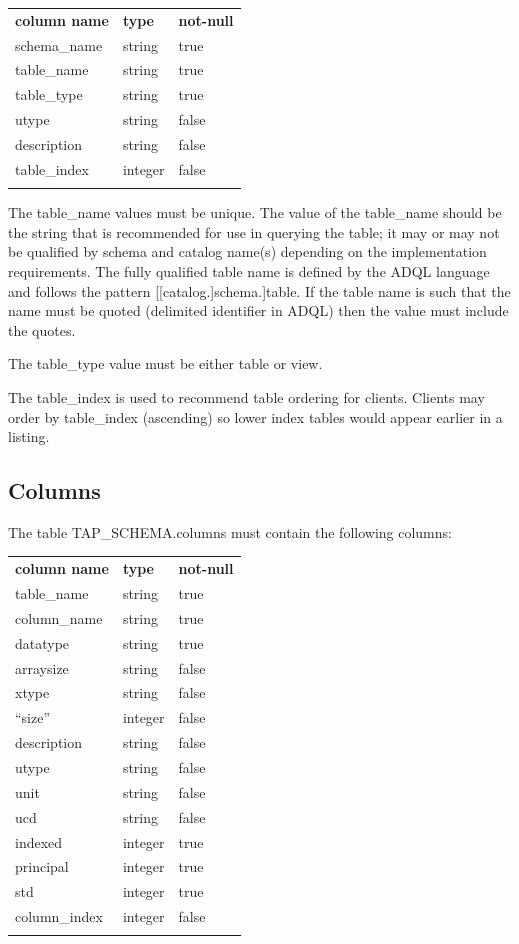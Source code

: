 \documentclass[11pt,letter]{ivoa}
\newcommand{\tapschema}{TAP\_SCHE\-MA}
\newcommand{\tapschema}{\mbox{%
  \relsize{-0.5}TAP\discretionary{-}{}{\kern-2pt\_}SCHEMA}}
\begin{document}
\begin{inlinetable}
\begin{tabular}{l l l}
\sptablerule
\textbf{column name} & \textbf{type} & \textbf{not-null} \\
\sptablerule
schema\_name & string & true \\
table\_name & string & true \\
table\_type & string & true \\
utype & string & false \\
description & string & false \\
table\_index & integer & false \\
\sptablerule
\end{tabular}
\end{inlinetable}

The table\_name values must be unique. The value of the 
table\_name should be the string that is recommended for use in 
querying the table; it may or may not be qualified by schema and catalog name(s) 
depending on the implementation requirements. The fully qualified table name is 
defined by the ADQL language and follows the pattern [[catalog.]schema.]table. 
If the table name is such that the name must be quoted (delimited identifier in 
ADQL) then the value must include the quotes.

The table\_type value must be either table or view.

The table\_index is used to recommend table ordering for clients. Clients 
may order by table\_index (ascending) so lower index tables would appear 
earlier in a listing.

\subsection{Columns}
\label{sec:tap-schema-columns}
The table \tapschema.columns must contain the following columns:

\begin{inlinetable}
\begin{tabular}{l l l}
\sptablerule
\textbf{column name} & \textbf{type} & \textbf{not-null} \\
\sptablerule
table\_name & string & true \\
column\_name & string & true \\
datatype & string & true \\
arraysize & string & false \\
xtype & string & false \\
``size'' & integer & false \\
description & string & false \\
utype & string & false \\
unit & string & false \\
ucd & string & false \\
indexed & integer & true \\
principal & integer & true \\
std & integer & true \\
column\_index & integer & false \\
\sptablerule
\end{tabular}
\end{inlinetable}
\end{document}
